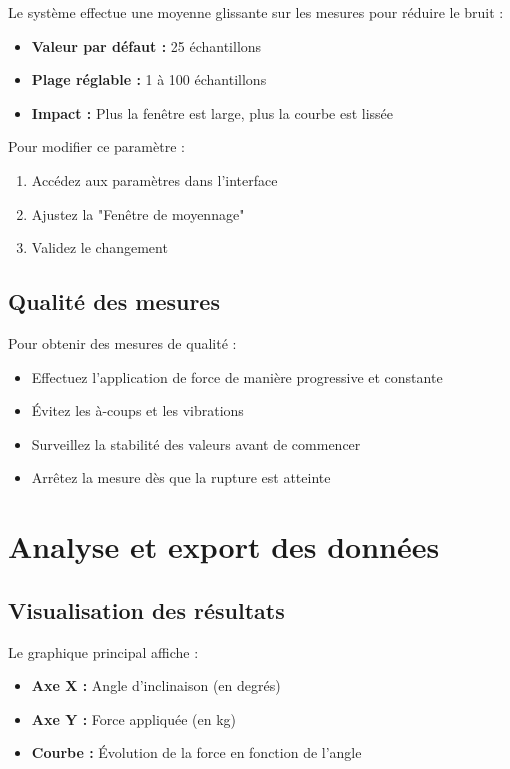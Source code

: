 \documentclass[12pt,a4paper]{article}
\begin{document}
Le système effectue une moyenne glissante sur les mesures pour réduire le bruit :
\begin{itemize}
    \item \textbf{Valeur par défaut :} 25 échantillons
    \item \textbf{Plage réglable :} 1 à 100 échantillons
    \item \textbf{Impact :} Plus la fenêtre est large, plus la courbe est lissée
\end{itemize}

Pour modifier ce paramètre :
\begin{enumerate}
    \item Accédez aux paramètres dans l'interface
    \item Ajustez la "Fenêtre de moyennage"
    \item Validez le changement
\end{enumerate}

\subsection{Qualité des mesures}

Pour obtenir des mesures de qualité :
\begin{itemize}
    \item Effectuez l'application de force de manière progressive et constante
    \item Évitez les à-coups et les vibrations
    \item Surveillez la stabilité des valeurs avant de commencer
    \item Arrêtez la mesure dès que la rupture est atteinte
\end{itemize}

\section{Analyse et export des données}

\subsection{Visualisation des résultats}

Le graphique principal affiche :
\begin{itemize}
    \item \textbf{Axe X :} Angle d'inclinaison (en degrés)
    \item \textbf{Axe Y :} Force appliquée (en kg)
    \item \textbf{Courbe :} Évolution de la force en fonction de l'angle
\end{itemize}
\end{document}
